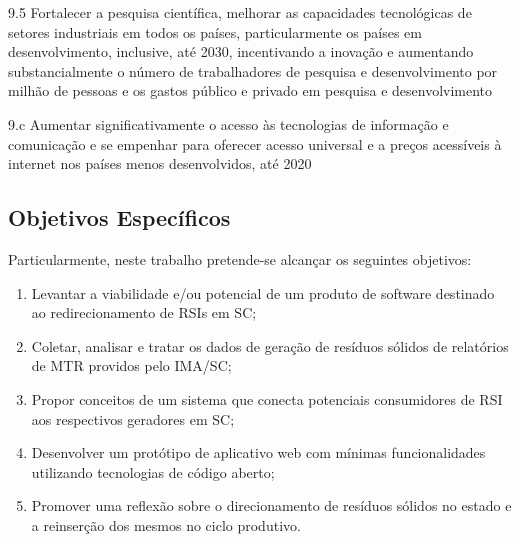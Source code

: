 \begin{citacao}
	9.5 Fortalecer a pesquisa científica, melhorar as capacidades tecnológicas de setores industriais em todos os países, particularmente os países em desenvolvimento, inclusive, até 2030, incentivando a inovação e aumentando substancialmente o número de trabalhadores de pesquisa e desenvolvimento por milhão de pessoas e os gastos público e privado em pesquisa e desenvolvimento
\end{citacao}

\begin{citacao}
	9.c Aumentar significativamente o acesso às tecnologias de informação e comunicação e se empenhar para oferecer acesso universal e a preços acessíveis à internet nos países menos desenvolvidos, até 2020
\end{citacao}

\subsection{Objetivos Específicos}

Particularmente, neste trabalho pretende-se alcançar os seguintes objetivos:
\begin{enumerate}
    \item Levantar a viabilidade e/ou potencial de um produto de software destinado ao redirecionamento de \gls{RSI}s em \gls{SC};
	\item Coletar, analisar e tratar os dados de geração de resíduos sólidos de relatórios de \gls{MTR} providos pelo \gls{IMA/SC};
	\item Propor conceitos de um sistema que conecta potenciais consumidores de \gls{RSI} aos respectivos geradores em \gls{SC};
	\item Desenvolver um protótipo de aplicativo web com mínimas funcionalidades utilizando tecnologias de código aberto;
	\item Promover uma reflexão sobre o direcionamento de resíduos sólidos no estado e a reinserção dos mesmos no ciclo produtivo.
\end{enumerate}